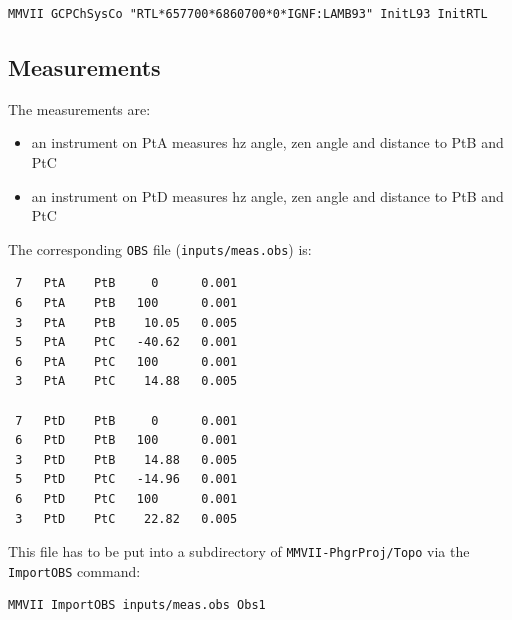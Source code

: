 \begin{lstlisting}
MMVII GCPChSysCo "RTL*657700*6860700*0*IGNF:LAMB93" InitL93 InitRTL
\end{lstlisting}

\subsection{Measurements}
The measurements are:
\begin{itemize}
   \item an instrument on PtA measures hz angle, zen angle and distance to PtB and PtC
   \item an instrument on PtD measures hz angle, zen angle and distance to PtB and PtC
\end{itemize}
The corresponding \texttt{OBS} file (\texttt{inputs/meas.obs}) is:
\begin{verbatim}
 7   PtA    PtB     0      0.001
 6   PtA    PtB   100      0.001
 3   PtA    PtB    10.05   0.005
 5   PtA    PtC   -40.62   0.001
 6   PtA    PtC   100      0.001
 3   PtA    PtC    14.88   0.005

 7   PtD    PtB     0      0.001
 6   PtD    PtB   100      0.001
 3   PtD    PtB    14.88   0.005
 5   PtD    PtC   -14.96   0.001
 6   PtD    PtC   100      0.001
 3   PtD    PtC    22.82   0.005
\end{verbatim}
This file has to be put into a subdirectory of \texttt{MMVII-PhgrProj/Topo} via the \texttt{ImportOBS} command:
\begin{lstlisting}
MMVII ImportOBS inputs/meas.obs Obs1
\end{lstlisting}


